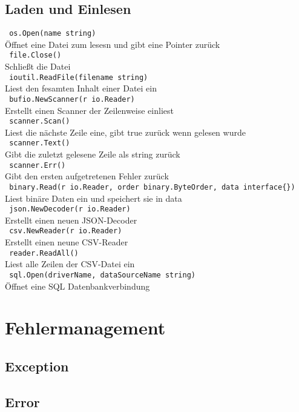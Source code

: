 \documentclass[twoside,a4paper,12pt]{article}
\begin{document}
\subsection{Laden und Einlesen}
\verb| os.Open(name string) | \\ 
Öffnet eine Datei zum lesesn und gibt eine Pointer zurück \\ 
\verb| file.Close() | \\ 
Schließt die Datei \\ 
\verb| ioutil.ReadFile(filename string) | \\ 
Liest den fesamten Inhalt einer Datei ein \\
\verb| bufio.NewScanner(r io.Reader) | \\ 
Erstellt einen Scanner der Zeilenweise einliest \\ 
\verb| scanner.Scan() | \\ 
Liest die nächste Zeile eine, gibt true zurück wenn gelesen wurde \\ 
\verb| scanner.Text() | \\ 
Gibt die zuletzt gelesene Zeile als string zurück \\ 
\verb| scanner.Err() | \\ 
Gibt den ersten aufgetretenen Fehler zurück \\ 
\verb| binary.Read(r io.Reader, order binary.ByteOrder, data interface{}) | \\ 
Liest binäre Daten ein und speichert sie in data \\ 
\verb| json.NewDecoder(r io.Reader) | \\ 
Erstellt einen neuen JSON-Decoder \\ 
\verb| csv.NewReader(r io.Reader) | \\ 
Erstellt einen neune CSV-Reader \\ 
\verb| reader.ReadAll() | \\ 
Liest alle Zeilen der CSV-Datei ein \\ 
\verb| sql.Open(driverName, dataSourceName string) | \\ 
Öffnet eine SQL Datenbankverbindung \\
\section{Fehlermanagement}
\subsection{Exception}
\subsection{Error}
\end{document}
